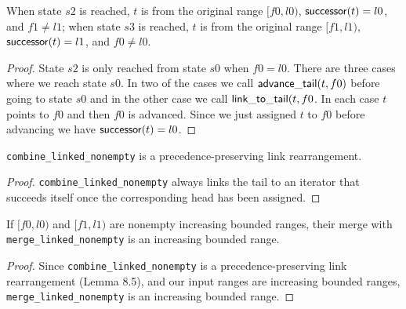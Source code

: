 \begin{lemma}
	When state $s2$ is reached, $t$ is from the original range $[f0, l0)$, $\mathsf{successor}(t) = l0$, and
	$f1 \neq l1$; when state $s3$ is reached, $t$ is from the original range $[f1, l1)$,
	$\mathsf{successor}(t) = l1$, and $f0 \neq l0$.
\end{lemma}

\begin{proof}
	State $s2$ is only reached from state $s0$ when $f0 = l0$. There are three cases where we reach state
	$s0$. In two of the cases we call $\mathsf{advance\_tail}(t, f0)$ before going to state $s0$ and in the other
	case we call $\mathsf{link\_to\_tail}(t, f0$. In each case $t$ points to $f0$ and then $f0$ is advanced. Since
	we just assigned $t$ to $f0$ before advancing we have $\mathsf{successor}(t) = l0$.
\end{proof}

\begin{lemma}
	\verb|combine_linked_nonempty| is a precedence-preserving link rearrangement.
\end{lemma}

\begin{proof}
	\verb|combine_linked_nonempty| always links the tail to an iterator that succeeds itself once the
	corresponding head has been assigned.
\end{proof}

\begin{lemma}
	If $[f0, l0)$ and $[f1, l1)$ are nonempty increasing bounded ranges, their merge with
	\verb|merge_linked_nonempty| is an increasing bounded range.
\end{lemma}

\begin{proof}
	Since \verb|combine_linked_nonempty| is a precedence-preserving link rearrangement (Lemma 8.5), and
	our input ranges are increasing bounded ranges, \verb|merge_linked_nonempty| is an increasing bounded
	range.
\end{proof}
